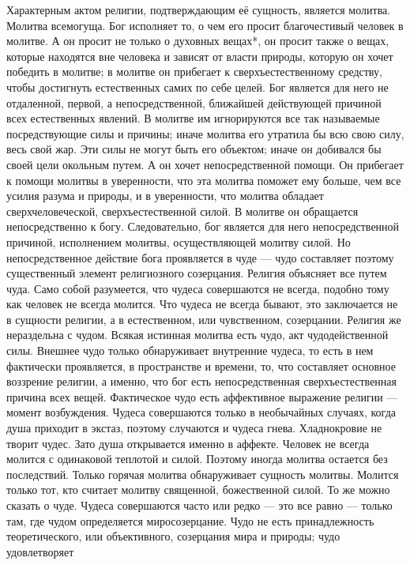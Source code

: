 \documentclass[12pt,oneside]{book}
\begin{document}
Характерным актом религии, подтверждающим её сущность, является молитва. Молитва всемогуща. Бог исполняет то, о чем его просит благочестивый человек в молитве. А он просит не только о духовных вещах*\let\svthefootnote\thefootnote\let\thefootnote\relax{}\let\thefootnote\svthefootnote, он просит также о вещах, которые находятся вне человека и зависят от власти природы, которую он хочет победить в молитве; в молитве он прибегает к сверхъестественному средству, чтобы достигнуть естественных самих по себе целей. Бог является для него не отдаленной, первой, а непосредственной, ближайшей действующей причиной всех естественных явлений. В молитве им игнорируются все так называемые посредствующие силы и причины; иначе молитва его утратила бы всю свою силу, весь свой жар. Эти силы не могут быть его объектом; иначе он добивался бы своей цели окольным путем. А он хочет непосредственной помощи. Он прибегает к помощи молитвы в уверенности, что эта молитва поможет ему больше, чем все усилия разума и природы, и в уверенности, что молитва обладает сверхчеловеческой, сверхъестественной силой\dag\let\svthefootnote\thefootnote\let\thefootnote\relax{}\let\thefootnote\svthefootnote. В молитве он обращается непосредственно к богу. Следовательно, бог является для него непосредственной причиной, исполнением молитвы, осуществляющей молитву силой. Но непосредственное действие бога проявляется в чуде --- чудо составляет поэтому существенный элемент религиозного созерцания. Религия объясняет все путем чуда. Само собой разумеется, что чудеса совершаются не всегда, подобно тому как человек не всегда молится. Что чудеса не всегда бывают, это заключается не в сущности религии, а в естественном, или чувственном, созерцании. Религия же нераздельна с чудом. Всякая истинная молитва есть чудо, акт чудодейственной силы. Внешнее чудо только обнаруживает внутренние чудеса, то есть в нем фактически проявляется, в пространстве и времени, то, что составляет основное воззрение религии, а именно, что бог есть непосредственная сверхъестественная причина всех вещей. Фактическое чудо есть аффективное выражение религии --- момент возбуждения. Чудеса совершаются только в необычайных случаях, когда душа приходит в экстаз, поэтому случаются и чудеса гнева. Хладнокровие не творит чудес. Зато душа открывается именно в аффекте. Человек не всегда молится с одинаковой теплотой и силой. Поэтому иногда молитва остается без последствий. Только горячая молитва обнаруживает сущность молитвы. Молится только тот, кто считает молитву священной, божественной силой. То же можно сказать о чуде. Чудеса совершаются часто или редко --- это все равно --- только там, где чудом определяется миросозерцание. Чудо не есть принадлежность теоретического, или объективного, созерцания мира и природы; чудо удовлетворяет 
\end{document}
